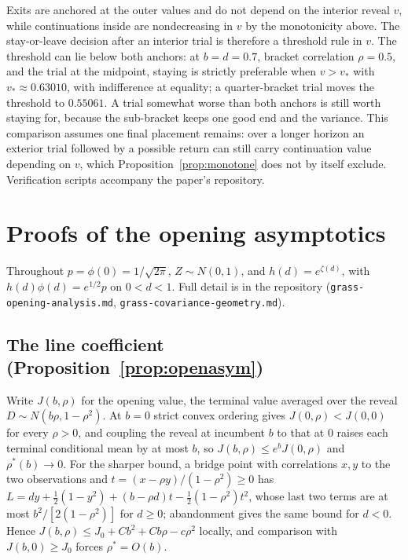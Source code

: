 \documentclass[11pt]{article}
\theoremstyle{itheads}
\begin{document}
Exits are anchored at the outer values and do not depend on the
interior reveal $v$, while continuations inside are nondecreasing in
$v$ by the monotonicity above. The stay-or-leave decision after an
interior trial is therefore a threshold rule in $v$. The threshold
can lie below both anchors: at $b = d = 0.7$, bracket correlation
$\rho = 0.5$, and the trial at the midpoint, staying is strictly
preferable when $v > v_{*}$ with $v_{*}\approx 0.63010$, with
indifference at equality; a quarter-bracket trial moves the threshold
to $0.55061$. A trial somewhat worse than both anchors is still worth
staying for, because the sub-bracket keeps one good end and the
variance. This comparison assumes one final placement remains: over a
longer horizon an exterior trial followed by a possible return can
still carry continuation value depending on $v$, which
Proposition~\ref{prop:monotone} does not by itself exclude.
Verification scripts accompany the paper's repository.

\section{Proofs of the opening asymptotics}\label{app:opening}

Throughout $p=\phi(0)=1/\sqrt{2\pi}$, $Z\sim N(0,1)$, and
$h(d)=e^{\zeta(d)}$, with $h(d)\phi(d)=e^{1/2}p$ on $0<d<1$. Full detail
is in the repository (\texttt{grass-opening-analysis.md},
\texttt{grass-covariance-geometry.md}).

\subsection*{The line coefficient (Proposition~\ref{prop:openasym})}

Write $J(b,\rho)$ for the opening value, the terminal value averaged
over the reveal $D\sim N(b\rho,1-\rho^{2})$. At $b=0$ strict convex
ordering gives $J(0,\rho)<J(0,0)$ for every $\rho>0$, and coupling the
reveal at incumbent $b$ to that at $0$ raises each terminal conditional
mean by at most $b$, so $J(b,\rho)\le e^{b}J(0,\rho)$ and
$\rho^{*}(b)\to0$. For the sharper bound, a bridge point with
correlations $x,y$ to the two observations and
$t=(x-\rho y)/(1-\rho^{2})\ge0$ has
$L=dy+\tfrac12(1-y^{2})+(b-\rho d)t-\tfrac12(1-\rho^{2})t^{2}$, whose
last two terms are at most $b^{2}/[2(1-\rho^{2})]$ for $d\ge0$;
abandonment gives the same bound for $d<0$. Hence
$J(b,\rho)\le J_0+Cb^{2}+Cb\rho-c\rho^{2}$ locally, and comparison with
$J(b,0)\ge J_0$ forces $\rho^{*}=O(b)$.
\end{document}
